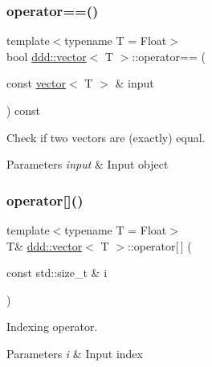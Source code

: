 \subsubsection{\texorpdfstring{operator==()}{operator==()}}
{\footnotesize\ttfamily template$<$typename T = Float$>$ \\
bool \hyperlink{classddd_1_1vector}{ddd\+::vector}$<$ T $>$\+::operator== (\begin{DoxyParamCaption}\item[{const \hyperlink{classddd_1_1vector}{vector}$<$ T $>$ \&}]{input }\end{DoxyParamCaption}) const\hspace{0.3cm}{\ttfamily [inline]}}



Check if two vectors are (exactly) equal. 


\begin{DoxyParams}{Parameters}
{\em input} & Input object \\
\hline
\end{DoxyParams}
\mbox{\label{classddd_1_1vector_a38e2123649fc4ebf839f22e5061b9497}} 
\subsubsection{\texorpdfstring{operator[]()}{operator[]()}\hspace{0.1cm}{\footnotesize\ttfamily [1/2]}}
{\footnotesize\ttfamily template$<$typename T = Float$>$ \\
T\& \hyperlink{classddd_1_1vector}{ddd\+::vector}$<$ T $>$\+::operator\mbox{[}$\,$\mbox{]} (\begin{DoxyParamCaption}\item[{const std\+::size\+\_\+t \&}]{i }\end{DoxyParamCaption})\hspace{0.3cm}{\ttfamily [inline]}}



Indexing operator. 


\begin{DoxyParams}{Parameters}
{\em i} & Input index \\
\hline
\end{DoxyParams}
\mbox{\label{classddd_1_1vector_a7e8d544a596450edb30914dcc21159fc}} 
